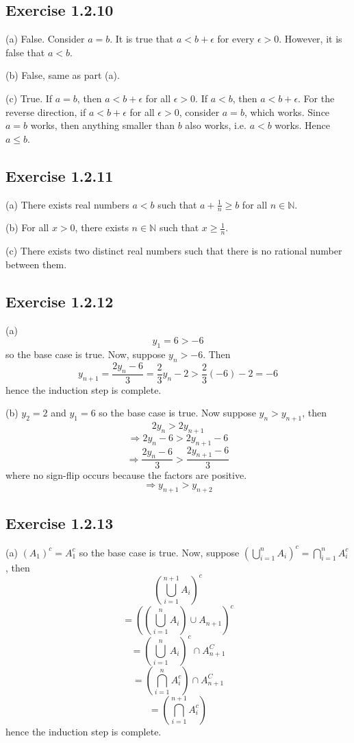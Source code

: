 \documentclass{book}
\begin{document}
\subsection*{Exercise 1.2.10}
(a)
False. Consider $a = b $. It is true that $a < b + \epsilon$ for every $\epsilon > 0$. However, it is false that $a < b$.

\noindent
(b)
False, same as part (a).

\noindent
(c)
True. If $a = b$, then $a < b + \epsilon$ for all $\epsilon > 0$. If $a < b$, then $a < b + \epsilon$. For the reverse direction, if $a < b + \epsilon$ for all $\epsilon > 0$, consider $a = b$, which works. Since $a = b$ works, then anything smaller than $b$ also works, i.e. $a < b$ works. Hence $a \leq b$.

\subsection*{Exercise 1.2.11}
(a)
There exists real numbers $a < b$ such that $a + \frac{1}{n} \geq b$ for all $n \in \mathbb{N}$.

\noindent
(b)
For all $x > 0$, there exists $n \in \mathbb{N}$ such that $x \geq \frac{1}{n}$.

\noindent
(c)
There exists two distinct real numbers such that there is no rational number between them.

\subsection*{Exercise 1.2.12}
(a)
$$y_1 = 6 > -6$$
so the base case is true. Now, suppose $y_n > -6$. Then
$$y_{n + 1} = \frac{2y_n - 6}{3} = \frac{2}{3}y_n - 2 > \frac{2}{3}(-6) - 2 = -6$$
hence the induction step is complete.

\noindent
(b)
$y_2 = 2$ and $y_1 = 6$ so the base case is true. Now suppose $y_n > y_{n + 1}$, then
$$2y_n > 2y_{n + 1}$$
$$\Rightarrow 2y_n - 6 > 2y_{n + 1} - 6$$
$$\Rightarrow \frac{2y_n - 6}{3} > \frac{2y_{n + 1} - 6}{3}$$
where no sign-flip occurs because the factors are positive.
$$\Rightarrow y_{n + 1} > y_{n + 2}$$

\subsection*{Exercise 1.2.13}
(a)
$(A_1)^c = A_1^c$ so the base case is true. Now, suppose $\left( \bigcup_{i = 1}^n A_i \right)^c = \bigcap_{i = 1}^n A_i^c$, then
$$\left( \bigcup_{i = 1}^{n + 1} A_i \right)^c$$
$$= \left( \left(\bigcup_{i = 1}^n A_i \right) \cup A_{n + 1} \right)^c$$
$$= \left(\bigcup_{i = 1}^n A_i \right)^c \cap A_{n + 1}^C$$
$$= \left( \bigcap_{i = 1}^n A_i^c \right) \cap A_{n + 1}^C$$
$$= \left( \bigcap_{i = 1}^{n + 1} A_i^c \right)$$
hence the induction step is complete.
\end{document}
